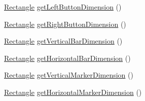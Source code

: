 \begin{DoxyCompactItemize}
\item 
\hyperlink{classgcn_1_1Rectangle}{Rectangle} \hyperlink{classgcn_1_1ScrollArea_aa71bee12598125f874fcf59e2ca337e8}{get\+Left\+Button\+Dimension} ()
\item 
\hyperlink{classgcn_1_1Rectangle}{Rectangle} \hyperlink{classgcn_1_1ScrollArea_a9629cc995d6e2dce35aba959125bda9c}{get\+Right\+Button\+Dimension} ()
\item 
\hyperlink{classgcn_1_1Rectangle}{Rectangle} \hyperlink{classgcn_1_1ScrollArea_aa6434c27c1b2201e493f7092cca93e4a}{get\+Vertical\+Bar\+Dimension} ()
\item 
\hyperlink{classgcn_1_1Rectangle}{Rectangle} \hyperlink{classgcn_1_1ScrollArea_a898c2796b20a332a1ae002c899aa4713}{get\+Horizontal\+Bar\+Dimension} ()
\item 
\hyperlink{classgcn_1_1Rectangle}{Rectangle} \hyperlink{classgcn_1_1ScrollArea_ab3548e5f4ade1f20963e4a9d1dd50798}{get\+Vertical\+Marker\+Dimension} ()
\item 
\hyperlink{classgcn_1_1Rectangle}{Rectangle} \hyperlink{classgcn_1_1ScrollArea_ae40cc4b46a667cc276119051e7c5d089}{get\+Horizontal\+Marker\+Dimension} ()
\end{DoxyCompactItemize}
